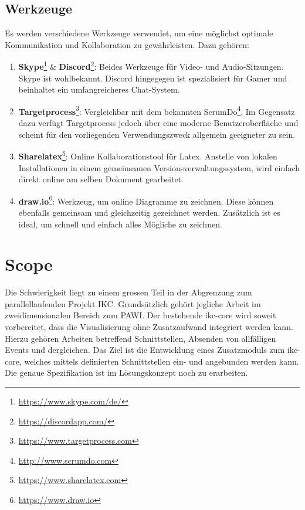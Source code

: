 \subsection{Werkzeuge}

Es werden verschiedene Werkzeuge verwendet, um eine möglichst optimale Kommunikation und Kollaboration zu gewährleisten. Dazu gehören:
\begin{enumerate}
\item \textbf{Skype}\footnote{\url{https://www.skype.com/de/}} \& \textbf{Discord}\footnote{\url{https://discordapp.com/}}: Beides Werkzeuge für Video- und Audio-Sitzungen. Skype ist wohlbekannt. Discord hingegegen ist spezialisiert für Gamer und beinhaltet ein umfangreicheres Chat-System.
\item \textbf{Targetprocess}\footnote{\url{https://www.targetprocess.com}}: Vergleichbar mit dem bekannten ScrumDo\footnote{\url{http://www.scrumdo.com}}. Im Gegensatz dazu verfügt Targetprocess jedoch über eine moderne Benutzeroberfläche und scheint für den vorliegenden Verwendungszweck allgemein geeigneter zu sein.
\item \textbf{Sharelatex}\footnote{\url{https://www.sharelatex.com}}: Online Kollaborationstool für Latex. Anstelle von lokalen Installationen in einem gemeinsamen Versions\-verwalt\-ungs\-sys\-tem, wird einfach direkt online am selben Dokument gearbeitet.
\item \textbf{draw.io}\footnote{\url{https://www.draw.io}}: Werkzeug, um online Diagramme zu zeichnen. Diese können ebenfalls gemeinsam und gleichzeitig gezeichnet werden. Zusätzlich ist es ideal, um schnell und einfach alles Mög\-liche zu zeichnen.
\end{enumerate}

\section{Scope}
\label{sec:scope}

Die Schwierigkeit liegt zu einem grossen Teil in der Abgrenzung zum parallellaufenden Projekt \gls{IKC}. Grundsätzlich gehört jegliche Arbeit im zweidimensionalen Bereich zum \gls{PAWI}. Der bestehende \gls{ikc-core} wird soweit vorbereitet, dass die Visualisierung ohne Zusatzaufwand integriert werden kann. Hierzu gehören Arbeiten betreffend Schnittstellen, Absenden von allfälligen \gls{Event}s und dergleichen. Das Ziel ist die Entwicklung eines Zusatzmoduls zum \gls{ikc-core}, welches mittels definierten Schnittstellen ein- und angebunden werden kann. Die genaue Spezifikation ist im Lösungskonzept noch zu erarbeiten.

